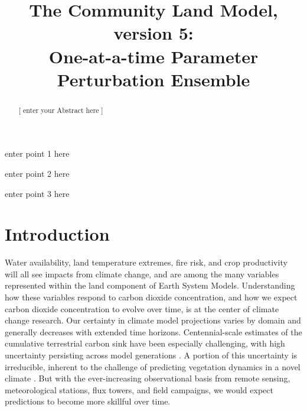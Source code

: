 \documentclass[draft]{agujournal2019}
\begin{document}
\title{The Community Land Model, version 5: \\ One-at-a-time Parameter Perturbation Ensemble}













\begin{keypoints}
\item enter point 1 here
\item enter point 2 here
\item enter point 3 here
\end{keypoints}



\begin{abstract}
[ enter your Abstract here ]
\end{abstract}







\section{Introduction}

Water availability, land temperature extremes, fire risk, and crop productivity will all see impacts from climate change, and are among the many variables represented within the land component of Earth System Models.
Understanding how these variables respond to carbon dioxide concentration, and how we expect carbon dioxide concentration to evolve over time, is at the center of climate change research.  
Our certainty in climate model projections varies by domain and generally decreases with extended time horizons.
Centennial-scale estimates of the cumulative terrestrial carbon sink have been especially challenging, with high uncertainty persisting across model generations \cite{friedlingstein2014,arora2020}. 
A portion of this uncertainty is irreducible, inherent to the challenge of predicting vegetation dynamics in a novel climate \cite{bonan2018}.
But with the ever-increasing observational basis from remote sensing, meteorological stations, flux towers, and field campaigns, we would expect predictions to become more skillful over time.
\end{document}
